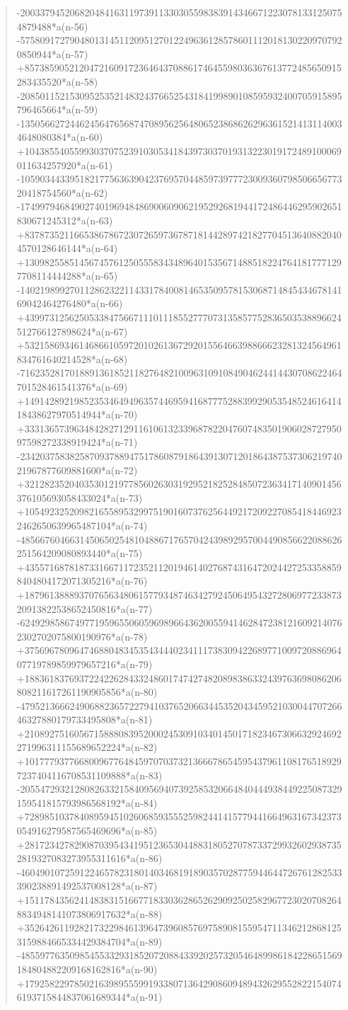 \documentclass[11pt,a4paper]{article}
\theoremstyle{plain}
\theoremstyle{definition}
\begin{document}
\begin{quote}
-200337945206820484163119739113303055983839143466712230781331250754879488*a(n-56) -575809172790480131451120951270122496361285786011120181302209707920850944*a(n-57) +8573859052120472160917236464370886174645598036367613772485650915283435520*a(n-58) -20850115215309525352148324376652543184199890108595932400705915895796465664*a(n-59) -135056627244624564765687470895625648065238686262963615214131140034648080384*a(n-60) +1043855405599303707523910305341843973037019313223019172489100069011634257920*a(n-61) -1059034433951821775636390423769570448597397772300936079850665677320418754560*a(n-62) -17499794684902740196948486900609062195292681944172486446295902651830671245312*a(n-63) +83787352116653867867230726597367871814428974218277045136408820404570128646144*a(n-64) +13098255851456745761250555834348964015356714885182247641817771297708114444288*a(n-65) -1402198992701128623221143317840081465350957815306871484543467814169042464276480*a(n-66) +4399731256250533847566711101118552777073135857752836503538896624512766127898624*a(n-67) +5321586934614686610597201026136729201556466398866623281324564961834761640214528*a(n-68) -71623528170188913618521182764821009631091084904624414430708622464701528461541376*a(n-69) +149142892198523534649496357446959416877752883992905354852461641418438627970514944*a(n-70) +333136573963484282712911610613233968782204760748350190602872795097598272338919424*a(n-71) -2342037583825870937889475178608791864391307120186438753730621974021967877609881600*a(n-72) +3212823520403530121977856026303192952182528485072363417140901456376105693058433024*a(n-73) +10549232520982165589532997519016073762564492172092270854184469232462650639965487104*a(n-74) -48566760466314506502548104886717657042439892957004490856622088626251564209080893440*a(n-75) +43557168781873316671172352112019461402768743164720244272533588598404804172071305216*a(n-76) +187961388893707656348061577934874634279245064954327280697723387320913822538652450816*a(n-77) -624929858674977195965506059698966436200559414628472381216092140762302702075800190976*a(n-78) +375696780964746880483453543444023411173830942268977100972088696407719789859979657216*a(n-79) +1883618376937224226284332486017474274820898386332439763698086206808211617261190905856*a(n-80) -4795213666249068823657227941037652066344535204345952103004470726646327880179733495808*a(n-81) +2108927516056715888083952000245309103401450171823467306632924692271996311155689652224*a(n-82) +10177793776680096776484597070373213666786545954379611081765189297237404116708531109888*a(n-83) -20554729321280826332158409569407392585320664840444938449225087329159541815793986568192*a(n-84) +7289851037840895945102606859355525982441415779441664963167342373054916279587565469696*a(n-85) +28172342782908703954341951236530448831805270787337299326029387352819327083273955311616*a(n-86) -46049010725912246578231801403468191890357028775944644726761282533390238891492537008128*a(n-87) +15117843562414838315166771833036286526290925025829677230207082648834948141073806917632*a(n-88) +35264261192821732298461396473960857697589081559547113462128681253159884665334429384704*a(n-89) -48559776350985455332931852072088433920257320546489986184228651569184804882209168162816*a(n-90) +17925822978502163989555991933807136429086094894326295528221540746193715844837061689344*a(n-91) 
\end{quote}
\end{document}
